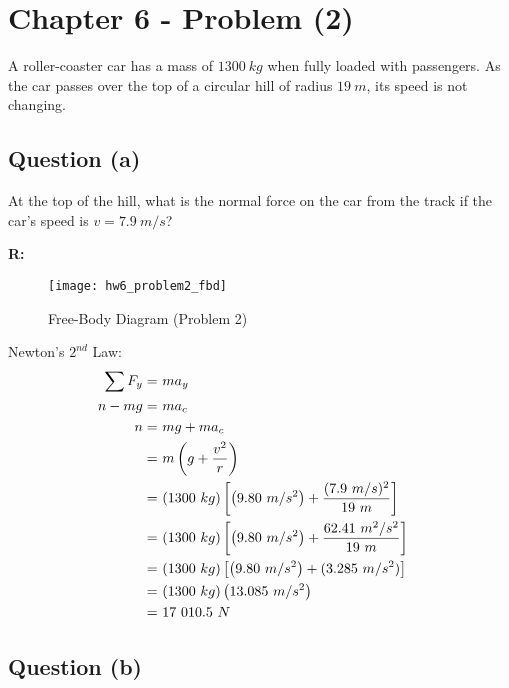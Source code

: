 \section{Chapter 6 - Problem (2)}

	A roller-coaster car has a mass of $1300 \ kg$ when fully loaded with passengers. As the car passes over the top of a circular hill of radius $19 \ m$, its speed is not changing.

	\subsection{Question (a)}

		At the top of the hill, what is the normal force on the car from the track if the car's speed is $v = 7.9 \ m/s$?

		\textbf{R:} \newline

		\begin{figure}[H]
			\begin{center}
				\texttt{[image: hw6\_problem2\_fbd]}
				\caption{Free-Body Diagram (Problem 2)}
				\label{fig:hw6_problem2_fbd}
			\end{center}
		\end{figure}

		Newton's $2^{nd}$ Law:
		\begin{align}
			\sum F_{y} = \ &ma_{y}& \notag \\
			n - mg = \ &ma_{c}& \notag \\
			n = \ &mg + ma_{c}& \notag \\
			= \ &m\left(g + \frac{v^{2}}{r} \right)& \notag \\
			= \ &(1300 \ kg)\left[\left(9.80 \ m/s^{2}\right) + \frac{(7.9 \ m/s)^{2}}{19 \ m} \right]& \notag \\
			= \ &(1300 \ kg)\left[\left(9.80 \ m/s^{2}\right) + \frac{62.41 \ m^{2}/s^{2}}{19 \ m} \right]& \notag \\
			= \ &(1300 \ kg)\left[\left(9.80 \ m/s^{2}\right) + (3.285 \ m/s^{2}) \right]& \notag \\
			= \ &(1300 \ kg)\left(13.085 \ m/s^{2} \right)& \notag \\
			= \ &17 \ 010.5 \ N&
		\end{align}

	\subsection{Question (b)}

